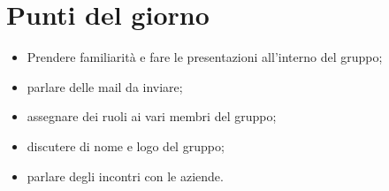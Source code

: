 \section{Punti del giorno}
        \begin{itemize}
            \item Prendere familiarità e fare le presentazioni all'interno del gruppo;
            \item parlare delle mail da inviare;
            \item assegnare dei ruoli ai vari membri del gruppo;
            \item discutere di nome e logo del gruppo;
            \item parlare degli incontri con le aziende.
        \end{itemize}